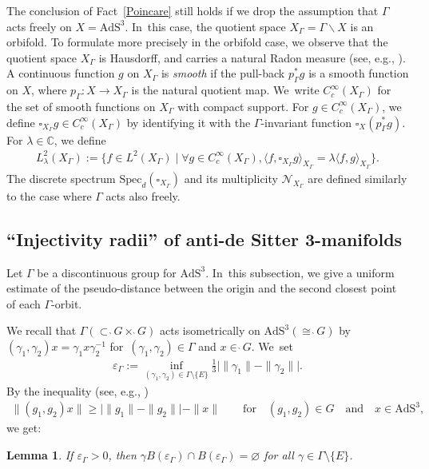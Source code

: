 \documentclass[pdftex]{sigma}
\numberwithin{equation}{section}
\newtheorem{Lemma}[Theorem]{Lemma}
\begin{document}
The conclusion of Fact~\ref{Poincare} still holds if
we drop the assumption that
$\Gamma$ acts freely on $X=\mathrm{AdS}^{3}$. In~this case, the quotient space $X_{\Gamma}=\Gamma\backslash X$ is an orbifold.
To formulate more precisely in the orbifold case, we observe that
the quotient space $X_{\Gamma}$ is Hausdorff, and carries a natural Radon measure
(see, e.g., \cite[Chapter~VII, Section~2, No.~2, Proposition~4]{Bourbaki-integral}).
A continuous function $g$ on $X_{\Gamma}$ is \textit{smooth} if
the pull-back $p_{\Gamma}^{*}g$ is a smooth function on $X$,
where $p_{\Gamma}\colon X\rightarrow X_{\Gamma}$ is the natural quotient
map. We~write $C_{c}^{\infty}(X_{\Gamma})$
for the set of smooth functions on $X_{\Gamma}$ with compact support.
For $g\in C_{c}^{\infty}(X_{\Gamma})$,
we define $\square_{X_{\Gamma}}g \in C_{c}^{\infty}(X_{\Gamma})$ by identifying it with
the $\Gamma$-invariant function $\square_{X}(p_{\Gamma}^{*}g)$.
For $\lambda\in \mathbb{C}$, we define
\begin{gather*}
L^{2}_{\lambda}(X_{\Gamma}) :=
\big\{f\in L^{2}(X_{\Gamma})\mid \forall g\in C_{c}^{\infty}(X_{\Gamma}),
\langle f,\square_{X_{\Gamma}} g\rangle_{X_{\Gamma}}=\lambda\langle f,g\rangle_{X_{\Gamma}}\big\}.
\end{gather*}
The discrete spectrum $\mathrm{Spec}_{d}(\square_{X_{\Gamma}})$ and
its multiplicity $\mathcal{N}_{X_{\Gamma}}$ are defined similarly
to the case where $\Gamma$ acts also freely.

\subsection{``Injectivity radii'' of anti-de Sitter 3-manifolds}\label{inj-radii}
Let $\Gamma$ be a discontinuous group for $\mathrm{AdS}^{3}$. In~this subsection, we give a uniform estimate of the pseudo-distance
between the origin and the second closest point of each $\Gamma$-orbit.

We recall that $\Gamma(\subset \grave{\ }G\times\grave{\ }G)$
acts isometrically on $\mathrm{AdS}^{3}(\cong\grave{\ }G)$ by
$(\gamma_{1},\gamma_{2})x=\gamma_{1} x\gamma_{2}^{-1}$
for~$(\gamma_{1},\gamma_{2})\in\Gamma$ and $x\in\grave{\ }G$. We~set
\begin{align}
\label{varepsilon}
\varepsilon_{\Gamma} := \inf_{(\gamma_1,\gamma_2)\in
\Gamma\setminus\{E\}}
\frac{1}{3}\big|\|\gamma_1\|-\|\gamma_2\|\big|.
\end{align}
By the inequality (see, e.g., \cite[Lemma~5.5]{Kan19})
\begin{gather*}
\|(g_1,g_2)x\|\geq \big | \|g_1\|-\|g_2\| \big | - \|x\|\qquad
\text{for}\quad (g_1,g_2) \in G \quad\text{and}\quad x \in \mathrm{AdS}^{3},
\end{gather*}
we get:
\begin{Lemma}\label{inj-rad}
If $\varepsilon_{\Gamma}>0$, then
$\gamma B(\varepsilon_{\Gamma}) \cap B(\varepsilon_{\Gamma})
= \varnothing$
for all $\gamma\in \Gamma\setminus\{E\}$.
\end{Lemma}
\end{document}
